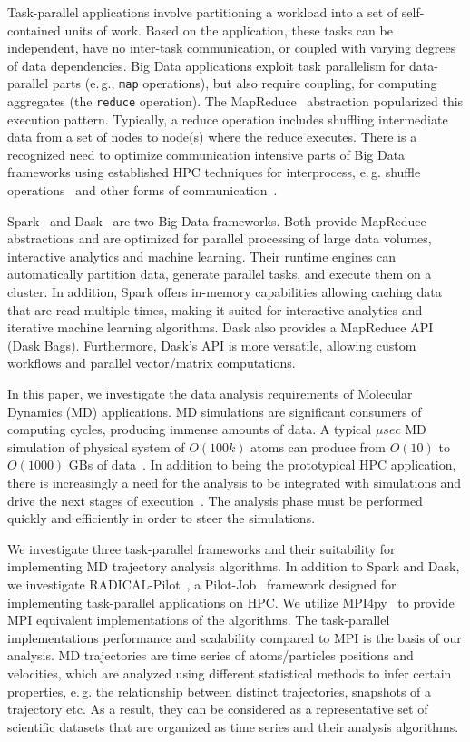 Task-parallel applications involve partitioning a workload into a set of self-contained units of work.
Based on the application, these tasks can be independent, have no inter-task communication, or coupled with varying degrees of data dependencies.
Big Data applications exploit task parallelism for data-parallel parts (e.\,g., \texttt{map} operations), but also require coupling, for computing aggregates (the \texttt{reduce} operation).
The MapReduce~\cite{mapreduce} abstraction popularized this execution pattern.
Typically, a reduce operation includes shuffling intermediate data from a set of nodes to node(s) where the reduce executes.
There is a recognized need to optimize communication intensive parts of Big Data frameworks using established HPC techniques for interprocess, e.\,g. shuffle operations~\cite{rdma-spark} and other forms of communication~\cite{hpc-abds,twisterNet}.

Spark~\cite{Zaharia_2010} and Dask~\cite{matthew_rocklin-proc-scipy-2015} are two Big Data frameworks.
Both provide MapReduce abstractions and are optimized for parallel processing of large data volumes, interactive analytics and machine learning.
Their runtime engines can automatically partition data, generate parallel tasks, and execute them on a cluster.
In addition, Spark offers in-memory capabilities allowing caching data that are read multiple times, making it suited for interactive analytics and iterative machine learning algorithms.
Dask also provides a MapReduce API (Dask Bags).
Furthermore, Dask's API is more versatile, allowing custom workflows and parallel vector/matrix computations.

In this paper, we investigate the data analysis requirements of Molecular Dynamics (MD) applications.
MD simulations are significant consumers of computing cycles, producing immense amounts of data.
A typical $\mu sec$ MD simulation of physical system of $O(100k)$ atoms can produce from $O(10)$ to $O(1000)$ GBs of data~\cite{Cheatham:2015}.
In addition to being the prototypical HPC application, there is increasingly a need for the analysis to be integrated with simulations and drive the next stages of execution~\cite{extasy}.
The analysis phase must be performed quickly and efficiently in order to steer the simulations.

We investigate three task-parallel frameworks and their suitability for implementing MD trajectory analysis algorithms.
In addition to Spark and Dask, we investigate RADICAL-Pilot~\cite{rp-jsspp18}, a Pilot-Job~\cite{pstar12} framework designed for implementing task-parallel applications on HPC.
We utilize MPI4py~\cite{mpi4py_paper} to provide MPI equivalent implementations of the algorithms.
The task-parallel implementations performance and scalability compared to MPI is the basis of our analysis.
MD trajectories are time series of atoms/particles positions and velocities, which are analyzed using different statistical methods to infer certain properties, e.\,g. the relationship between distinct trajectories, snapshots of a trajectory etc.
As a result, they can be considered as a representative set of scientific datasets that are organized as time series and their analysis algorithms. 

